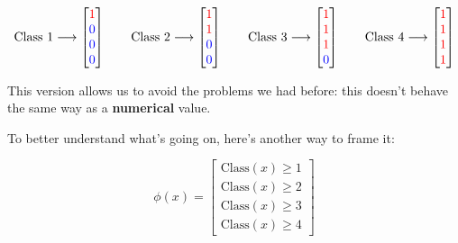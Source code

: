                 \begin{equation*}
                    \text{Class 1} \longrightarrow
                    \begin{bmatrix}
                    \textcolor{red}{1} \\ \textcolor{blue}{0} \\ \textcolor{blue}{0} \\ \textcolor{blue}{0}
                    \end{bmatrix}
                    \qquad 
                    \text{Class 2} \longrightarrow
                    \begin{bmatrix}
                    \textcolor{red}{1} \\ \textcolor{red}{1} \\ \textcolor{blue}{0} \\ \textcolor{blue}{0}
                    \end{bmatrix}
                    \qquad 
                    \text{Class 3} \longrightarrow
                    \begin{bmatrix}
                    \textcolor{red}{1} \\ \textcolor{red}{1} \\ \textcolor{red}{1} \\ \textcolor{blue}{0}
                    \end{bmatrix}
                    \qquad 
                    \text{Class 4} \longrightarrow
                    \begin{bmatrix}
                    \textcolor{red}{1} \\ \textcolor{red}{1} \\ \textcolor{red}{1} \\ \textcolor{red}{1}
                    \end{bmatrix}
                    \end{equation*}
                
                This version allows us to avoid the problems we had before: this doesn't behave the same way as a \textbf{numerical} value.

                To better understand what's going on, here's another way to frame it:

                \begin{equation}
                    \phi(x) =
                    \begin{bmatrix}
                    \text{Class}(x)\geq 1 \\
                    \text{Class}(x)\geq 2 \\
                    \text{Class}(x)\geq 3 \\
                    \text{Class}(x)\geq 4
                    \end{bmatrix}
                \end{equation}

